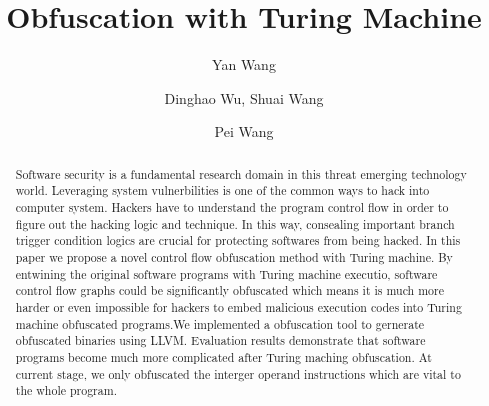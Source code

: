 \documentclass[lnicst]{svmultln}
\begin{document}
%
\mainmatter              %
%
\title{Obfuscation with Turing Machine}
%
%
\author{Yan Wang \and Dinghao Wu,
Shuai Wang \and Pei Wang}
%
%
%
\institute{Pennsylvania State University, State College,PA 16801, USA,\\
\email{ybw5084@ist.psu.edu},\\ WWW home page:
\texttt{http://users/\homedir iekeland/web/welcome.html}
}
\maketitle              

\begin{abstract}        %
Software security is a fundamental research domain in this threat emerging technology world. Leveraging system vulnerbilities is one of the common ways to hack into 
computer system. Hackers have to understand the program control flow in order to figure out the hacking logic and technique. In this way, consealing important branch trigger condition logics are crucial for protecting softwares from being hacked. In this paper we propose a novel control flow obfuscation method with Turing machine. By entwining the original software programs with Turing machine executio, software control flow graphs could be significantly obfuscated which means it is much more harder or even impossible for hackers to embed malicious execution codes into Turing machine obfuscated programs.We implemented a obfuscation tool to gernerate obfuscated binaries using LLVM. Evaluation results demonstrate that software programs become much more complicated after Turing maching obfuscation. At current stage, we only obfuscated the interger operand instructions which are vital to the whole program.
\end{abstract}
%
\end{document}
